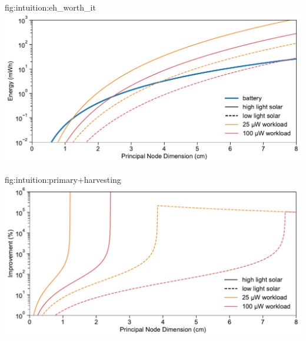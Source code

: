 \begin{definefigure}{fig:intuition:eh_worth_it}
  \centering
  \includegraphics[width=\columnwidth]{figs/is_eh_worth_it.pdf}
  \caption{
  An updated energy-harvesting reality check~\cite{yervaGrafting12}. This figure compares the energy offered by a battery with that of potential harvestable energy over the lifetime of the same battery. Assuming a cubic sensor, driven by a  principal dimension $L$, a battery of size $L^3$ provides a lifetime of $T$, under different average workloads, here represented by the orange (average 25\si{\micro\watt}) and red (100\si{\micro\watt}). 
  A solar cell of size $L^2$ accumulates energy over that same lifetime $T$, and if large enough and in sufficient harvesting conditions, will exceed that of a similar sized battery, albeit only in 2 dimensions.  The point at which the harvesting lines (orange, red) cross the battery line (blue) indicate the size at which a solar panel of size $L^2$ will harvest the same amount of energy provided by a battery of size $L^3$ over its lifetime. At a sufficient size and in sufficient harvesting conditions, while powering an appropriate workload, solar energy-harvesting can provide more energy over the same time frame as a lithium battery.
  }
\end{definefigure}

\begin{definefigure}{fig:intuition:primary+harvesting}
  \centering
  \includegraphics[width=\columnwidth]{figs/primary+harvesting.pdf}
  \caption{
  blah
  }
\end{definefigure}